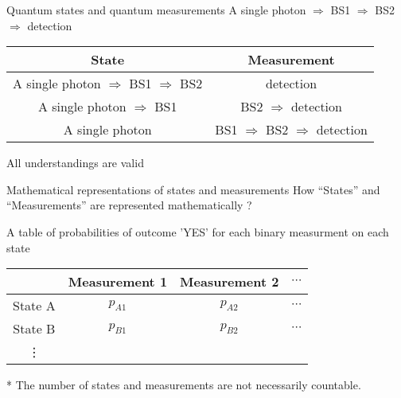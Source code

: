 \documentclass{beamer}
\theoremstyle{definition}
\begin{document}

\begin{frame}{Quantum states and quantum measurements}
\centering
A single photon $\Rightarrow$ BS1 $\Rightarrow$ BS2 $\Rightarrow$ detection

\vspace{2em}
\begin{tabular}{|c|c|}
\hline
State & Measurement \\
\hline
A single photon $\Rightarrow$ BS1 $\Rightarrow$ BS2 & detection\\
A single photon $\Rightarrow$ BS1 & BS2 $\Rightarrow$ detection\\
A single photon & BS1 $\Rightarrow$ BS2 $\Rightarrow$ detection\\
\hline
\end{tabular}

\vspace{5em}
\Large
All understandings are valid
\end{frame}

\begin{frame}{Mathematical representations of states and measurements}
How ``States'' and ``Measurements'' are represented mathematically ?

\vspace{2em}
\centering
A table of probabilities of outcome 'YES' for each binary measurment on each state

\vspace{1em}
\begin{tabular}{|c||c|c|c|}
\hline
& Measurement 1 & Measurement 2 & $\cdots$\\
\hline
\hline
State A& $p_{A1}$ & $p_{A2}$ & $\cdots$\\
State B& $p_{B1}$ & $p_{B2}$ & $\cdots$\\
\vdots& &&\\
\hline
\end{tabular}

\vspace{2em}
* The number of states and measurements are not necessarily countable.

%
\end{frame}
\end{document}
